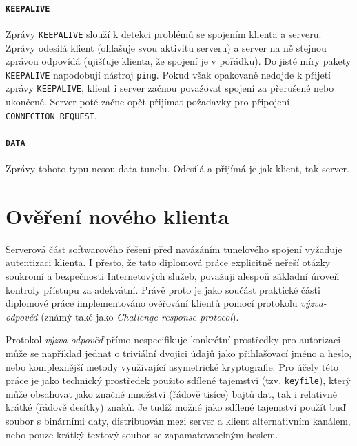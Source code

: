 \documentclass[thesis=M,czech]{FITthesis}[2012/10/20]
\begin{document}
  \paragraph{\texttt{KEEPALIVE}}
    
    Zprávy \texttt{KEEPALIVE} slouží k detekci problémů se spojením klienta a serveru. Zprávy odesílá klient (ohlašuje svou aktivitu serveru) a server na ně stejnou zprávou odpovídá (ujišťuje klienta, že spojení je v pořádku). Do jisté míry pakety \texttt{KEEPALIVE} napodobují nástroj \texttt{ping}. Pokud však opakovaně nedojde k přijetí zprávy \texttt{KEEPALIVE}, klient i server začnou považovat spojení za přerušené nebo ukončené. Server poté začne opět přijímat požadavky pro připojení \texttt{CONNECTION\_REQUEST}.
  
  \paragraph{\texttt{DATA}}
  
    Zprávy tohoto typu nesou data tunelu. Odesílá a přijímá je jak klient, tak server.
    
\section{Ověření nového klienta}
\label{sec:challenge-response}

Serverová část softwarového řešení před navázáním tunelového spojení vyžaduje autentizaci klienta. I přesto, že tato diplomová práce explicitně neřeší otázky soukromí a bezpečnosti Internetových služeb, považuji alespoň základní úroveň kontroly přístupu za adekvátní. Právě proto je jako součást praktické části diplomové práce implementováno ověřování klientů pomocí protokolu \textit{výzva-odpověď} (známý také jako \textit{Challenge-response protocol}).

Protokol \textit{výzva-odpověď} přímo nespecifikuje konkrétní prostředky pro autorizaci -- může se například jednat o triviální dvojici údajů jako přihlašovací jméno a heslo, nebo komplexnější metody využívající asymetrické kryptografie. Pro účely této práce je jako technický prostředek použito sdílené tajemství (tzv. \texttt{keyfile}), který může obsahovat jako značné množství (řádově tisíce) bajtů dat, tak i relativně krátké (řádově desítky) znaků. Je tudíž možné jako sdílené tajemství použít buď soubor s binárními daty, distribuován mezi server a klient alternativním kanálem, nebo pouze krátký textový soubor se zapamatovatelným heslem.
\end{document}
